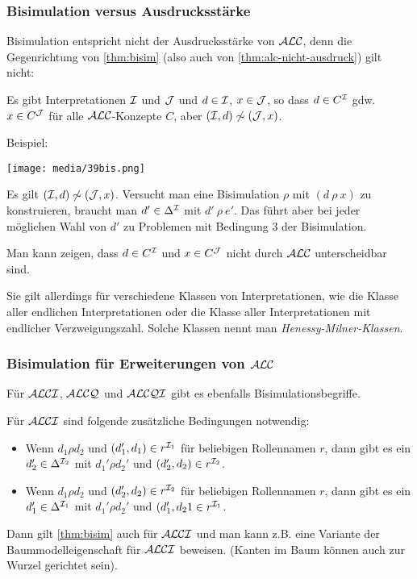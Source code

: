 \subsubsection{Bisimulation versus Ausdrucksstärke}\label{bisimulation-versus-ausdrucksstuxe4rke}

Bisimulation entspricht nicht der Ausdrucksstärke von $\mathcal{A}\mathcal{L}\mathcal{C}$, denn die Gegenrichtung von \autoref{thm:bisim} (also auch von \autoref{thm:alc-nicht-ausdruck}) gilt nicht:

Es gibt Interpretationen $\mathcal{I}$ und $\mathcal{J}$ und $d \in \mathcal{I}$, $x \in \mathcal{J}$, so dass $d \in C^{\mathcal{I}}$ gdw. $x \in C^{\mathcal{J}}$ für alle $\mathcal{A}\mathcal{L}\mathcal{C}$-Konzepte $C$, aber $(\mathcal{I},d) \not\sim (\mathcal{J},x)$. 

\begin{tafel}
Beispiel:

\texttt{[image: media/39bis.png]}

Es gilt $(\mathcal{I}, d) \not\sim (\mathcal{J}, x)$. Versucht man eine Bisimulation $\rho$ mit $(d\ \rho\ x)$ zu konstruieren, braucht man $d' \in \Delta^{\mathcal{I}}$ mit $d'\ \rho\ e'$. Das führt aber bei jeder möglichen Wahl von $d'$ zu Problemen mit Bedingung 3 der Bisimulation.

Man kann zeigen, dass $d \in C^{\mathcal{I}}$ und $x \in C^{\mathcal{J}}$ nicht durch $\mathcal{A}\mathcal{L}\mathcal{C}$ unterscheidbar sind.
\end{tafel}

Sie gilt allerdings für verschiedene Klassen von Interpretationen, wie die Klasse aller endlichen Interpretationen oder die Klasse aller Interpretationen mit endlicher Verzweigungszahl. Solche Klassen nennt man \emph{Henessy-Milner-Klassen}.

\subsubsection{Bisimulation für Erweiterungen von \texorpdfstring{$\mathcal{A}\mathcal{L}\mathcal{C}$}{ALC}}\label{bisimulation-in-alc}

Für $\mathcal{A}\mathcal{L}\mathcal{C}\mathcal{I}$, $\mathcal{A}\mathcal{L}\mathcal{C}\mathcal{Q}$ und $\mathcal{A}\mathcal{L}\mathcal{C}\mathcal{Q}\mathcal{I}$ gibt es ebenfalls Bisimulationsbegriffe.

Für $\mathcal{A}\mathcal{L}\mathcal{C}\mathcal{I}$ sind folgende zusätzliche Bedingungen notwendig:
\begin{itemize}
    \item Wenn $d_1 \rho d_2$ und $(d_1', d_1) \in r^{\mathcal{I}_1}$ für beliebigen Rollennamen $r$, dann gibt es ein $d_2' \in \Delta^{\mathcal{I}_2}$ mit $d_1' \rho d_2'$ und $(d_2', d_2) \in r^{\mathcal{I}_2}$.
    \item Wenn $d_1 \rho d_2$ und $(d_2', d_2) \in r^{\mathcal{I}_2}$ für beliebigen Rollennamen $r$, dann gibt es ein $d_1' \in \Delta^{\mathcal{I}_1}$ mit $d_1' \rho d_2'$ und $(d_1', d_21 \in r^{\mathcal{I}_1}$.
\end{itemize}
Dann gilt \autoref{thm:bisim} auch für $\mathcal{A}\mathcal{L}\mathcal{C}\mathcal{I}$ und man kann z.B. eine Variante der Baummodelleigenschaft für $\mathcal{A}\mathcal{L}\mathcal{C}\mathcal{I}$ beweisen. (Kanten im Baum können auch zur Wurzel gerichtet sein).

